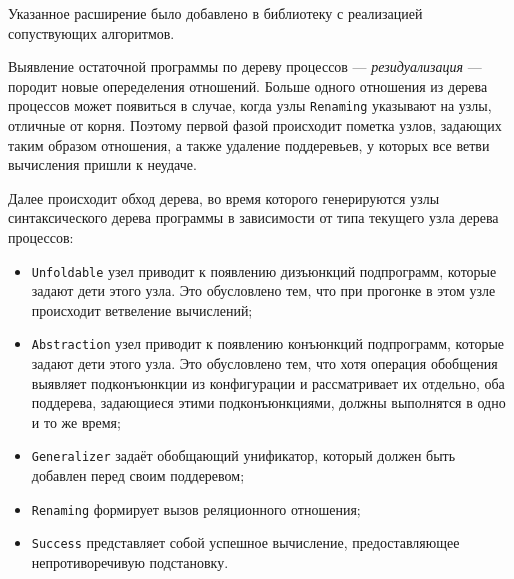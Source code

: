 Указанное расширение было добавлено в библиотеку с реализацией сопуствующих алгоритмов.

Выявление остаточной программы по дереву процессов --- \emph{резидуализация} ---
породит новые опеределения отношений. Больше одного отношения из дерева процессов может
появиться в случае, когда узлы \lstinline{Renaming} указывают на узлы, отличные от корня.
Поэтому первой фазой происходит пометка узлов, задающих таким образом отношения,
а также удаление поддеревьев, у которых все ветви вычисления пришли к неудаче.

Далее происходит обход дерева, во время которого генерируются узлы синтаксического дерева программы
в зависимости от типа текущего узла дерева процессов:
\begin{itemize}
\item \lstinline{Unfoldable} узел приводит к появлению дизъюнкций подпрограмм, которые задают дети этого узла.
      Это обусловлено тем, что при прогонке в этом узле происходит ветвеление вычислений;
\item \lstinline{Abstraction} узел приводит к появлению конъюнкций подпрограмм, которые задают дети этого узла.
	  Это обусловлено тем, что хотя операция обобщения выявляет подконъюнкции из конфигурации и рассматривает их отдельно,
	  оба поддерева, задающиеся этими подконъюнкциями, должны выполнятся в одно и то же время;
\item \lstinline{Generalizer} задаёт обобщающий унификатор, который должен быть добавлен
      перед своим поддеревом;
\item \lstinline{Renaming} формирует вызов реляционного отношения;
\item \lstinline{Success} представляет собой успешное вычисление, предоставляющее непротиворечивую подстановку.
\end{itemize}
